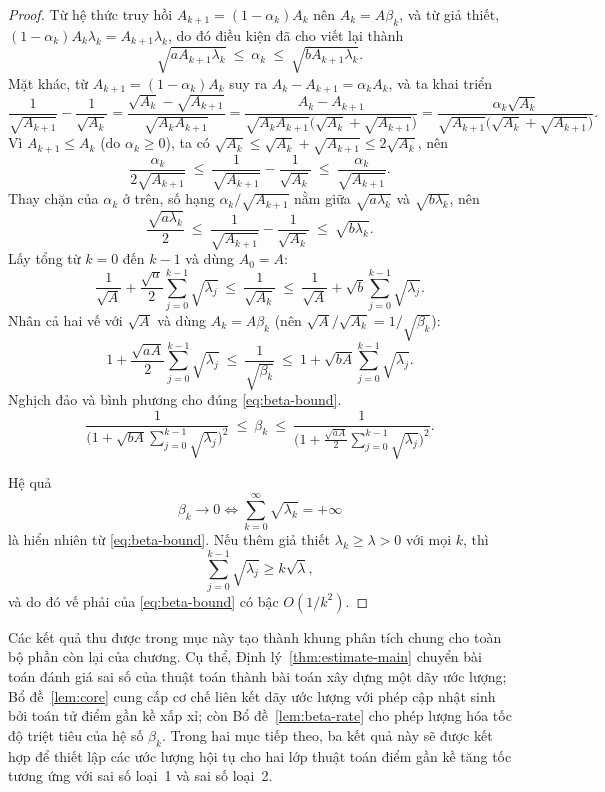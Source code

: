 \begin{essayonly}
\begin{proof}
Từ hệ thức truy hồi $A_{k+1}=(1-\alpha_k)A_k$ nên $A_k = A\beta_k$, và từ giả thiết, $(1-\alpha_k)A_k\lambda_k = A_{k+1}\lambda_k$, do đó điều kiện đã cho viết lại thành
\[
  \sqrt{aA_{k+1}\lambda_k} \ \le\ \alpha_k \ \le\ \sqrt{bA_{k+1}\lambda_k}.
\]
Mặt khác, từ $A_{k+1}=(1-\alpha_k)A_k$ suy ra $A_k-A_{k+1}=\alpha_k A_k$,
và ta khai triển
\[
  \frac{1}{\sqrt{A_{k+1}}} - \frac{1}{\sqrt{A_k}}
  = \frac{\sqrt{A_k}-\sqrt{A_{k+1}}}{\sqrt{A_kA_{k+1}}}
  = \frac{A_k-A_{k+1}}{\sqrt{A_kA_{k+1}}\big(\sqrt{A_k}+\sqrt{A_{k+1}}\big)}
  = \frac{\alpha_k\sqrt{A_k}}{\sqrt{A_{k+1}}\big(\sqrt{A_k}+\sqrt{A_{k+1}}\big)}.
\]
Vì $A_{k+1}\le A_k$ (do $\alpha_k\ge0$), ta có
$\sqrt{A_k}\le\sqrt{A_k}+\sqrt{A_{k+1}}\le2\sqrt{A_k}$, nên
\[
  \frac{\alpha_k}{2\sqrt{A_{k+1}}}
  \ \le\ \frac{1}{\sqrt{A_{k+1}}}-\frac{1}{\sqrt{A_k}}
  \ \le\ \frac{\alpha_k}{\sqrt{A_{k+1}}}.
\]
Thay chặn của $\alpha_k$ ở trên, số hạng $\alpha_k/\sqrt{A_{k+1}}$ nằm
giữa $\sqrt{a\lambda_k}$ và $\sqrt{b\lambda_k}$, nên
\[
  \frac{\sqrt{a\lambda_k}}{2}
  \ \le\ \frac{1}{\sqrt{A_{k+1}}}-\frac{1}{\sqrt{A_k}}
  \ \le\ \sqrt{b\lambda_k}.
\]
Lấy tổng từ $k=0$ đến $k-1$ và dùng $A_0=A$:
\[
  \frac{1}{\sqrt A} + \frac{\sqrt a}2\sum_{j=0}^{k-1}\sqrt{\lambda_j}
  \ \le\ \frac{1}{\sqrt{A_k}}
  \ \le\ \frac{1}{\sqrt A} + \sqrt b\sum_{j=0}^{k-1}\sqrt{\lambda_j}.
\]
Nhân cả hai vế với $\sqrt A$ và dùng $A_k=A\beta_k$ (nên
$\sqrt A/\sqrt{A_k}=1/\sqrt{\beta_k}$):
\[
  1+\frac{\sqrt{aA}}2\sum_{j=0}^{k-1}\sqrt{\lambda_j}
  \ \le\ \frac{1}{\sqrt{\beta_k}}
  \ \le\ 1+\sqrt{bA}\sum_{j=0}^{k-1}\sqrt{\lambda_j}.
\]
Nghịch đảo và bình phương cho đúng \eqref{eq:beta-bound}.
\begin{equation*}
  \frac{1}{\Big(1+\sqrt{bA}\sum_{j=0}^{k-1}\sqrt{\lambda_j}\Big)^2}
  \ \le\ \beta_k \ \le\
  \frac{1}{\Big(1+\tfrac{\sqrt{aA}}2\sum_{j=0}^{k-1}\sqrt{\lambda_j}\Big)^2}.
\end{equation*}

Hệ quả
\[
\beta_k\to0
\iff
\sum_{k=0}^{\infty}\sqrt{\lambda_k}=+\infty
\]
là hiển nhiên từ \eqref{eq:beta-bound}. Nếu thêm giả thiết
$\lambda_k\ge\lambda>0$ với mọi $k$, thì
\[
\sum_{j=0}^{k-1}\sqrt{\lambda_j}
\ge
k\sqrt\lambda,
\]
và do đó vế phải của \eqref{eq:beta-bound} có bậc $O(1/k^2)$.
\end{proof}
\end{essayonly}

\begin{essayonly}
Các kết quả thu được trong mục này tạo thành khung phân tích chung cho toàn bộ phần còn lại của chương. Cụ thể, Định lý~\ref{thm:estimate-main} chuyển bài toán đánh giá sai số của thuật toán thành bài toán xây dựng một dãy ước lượng; Bổ đề~\ref{lem:core} cung cấp cơ chế liên kết dãy ước lượng với phép cập nhật sinh bởi toán tử điểm gần kề xấp xỉ; còn Bổ đề~\ref{lem:beta-rate} cho phép lượng hóa tốc độ triệt tiêu của hệ số $\beta_k$. Trong hai mục tiếp theo, ba kết quả này sẽ được kết hợp để thiết lập các ước lượng hội tụ cho hai lớp thuật toán điểm gần kề tăng tốc tương ứng với sai số loại~1 và sai số loại~2.
\end{essayonly}

